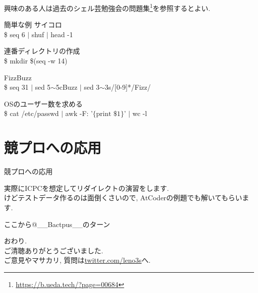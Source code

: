 \documentclass[uplatex, dvipdfmx, unicode]{beamer}
\begin{document}
\begin{frame}
  興味のある人は過去のシェル芸勉強会の問題集\footnote{\url{https://b.ueda.tech/?page=00684}}を参照するとよい.
\end{frame}

\begin{frame}{簡単な例}
  サイコロ \\
  \$ seq 6 $|$ shuf $|$ head -1 \\
  \vspace{0.2in}

  連番ディレクトリの作成 \\
  \$ mkdir \$(seq -w 14)
  \vspace{0.2in}
  
  FizzBuzz \\
  \$ seq 31 $|$ sed 5$\sim$5cBuzz $|$ sed 3$\sim$3s/[0-9]*/Fizz/
  \vspace{0.2in}

  OSのユーザー数を求める \\
  \$ cat /etc/passwd $|$ awk -F: '$\{\text{print \$1}\}$' $|$ wc -l
\end{frame}

\section{競プロへの応用}
\begin{frame}
  \centering
  \Huge{競プロへの応用}
\end{frame}

\begin{frame}
  実際にICPCを想定してリダイレクトの演習をします. \\
  けどテストデータ作るのは面倒くさいので, AtCoderの例題でも解いてもらいます. \\
\end{frame}

\begin{frame}
  ここから@\_\_Bactpus\_\_のターン
\end{frame}

\begin{frame}
  \centering
  \Large
  おわり. \\
  \normalsize
  ご清聴ありがとうございました. \\
  ご意見やマサカリ, 質問は\url{twitter.com/leno3s}へ.
\end{frame}
\end{document}
